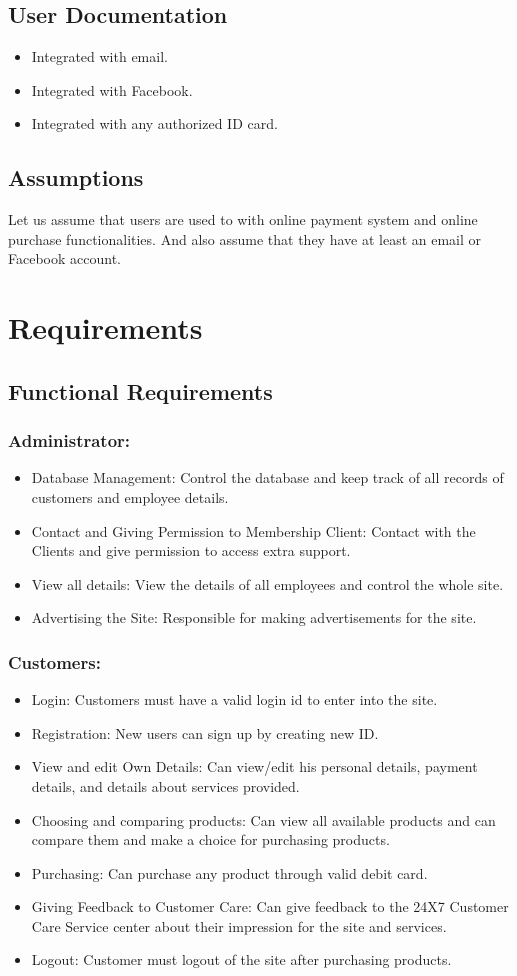\documentclass{article}
\begin{document}
\subsection{User Documentation}
\begin{itemize}
\item Integrated with email.
\item Integrated with Facebook.
\item Integrated with any authorized ID card.
\end{itemize}
\subsection{Assumptions}
Let us assume that users are used to with online payment system and online purchase functionalities. And also assume that they have at least an email or Facebook account.
\section{Requirements}
\subsection{Functional Requirements}
\subsubsection{Administrator:}
\begin{itemize}
\item Database Management: Control the database and keep track of all records of customers and employee details.
\item Contact and Giving Permission to Membership Client: Contact with the Clients and give permission to access extra support.
\item View all details: View the details of all employees and control the whole site.
\item Advertising the Site: Responsible for making advertisements for the site.
\end{itemize}
\subsubsection{Customers:}
\begin{itemize}
\item Login: Customers must have a valid login id to enter into the site.
\item Registration: New users can sign up by creating new ID.
\item View and edit Own Details: Can view/edit his personal details, payment details, and details about services provided.
\item Choosing and comparing products: Can view all available products and can compare them and make a choice for purchasing 		products.
\item Purchasing: Can purchase any product through valid debit card.
\item Giving Feedback to Customer Care: Can give feedback to the 24X7 Customer Care Service center about their impression for the 		site and services.
\item Logout: Customer must logout of the site after purchasing products.
\end{itemize}
\end{document}

